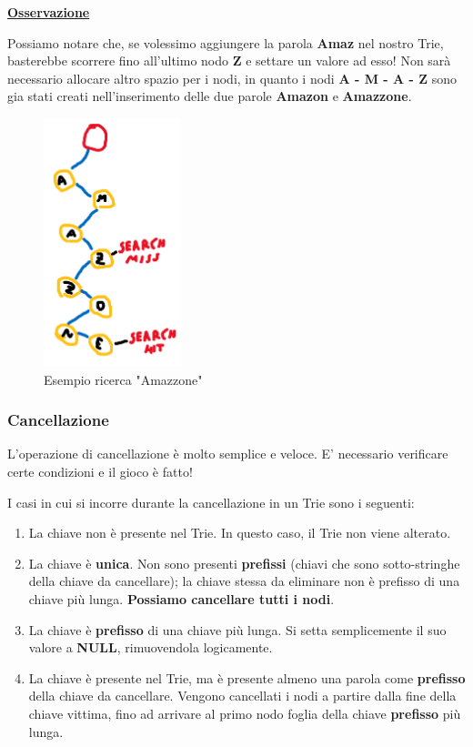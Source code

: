 \documentclass[a4paper, 12pt]{article}
\begin{document}
\textbf{\underline{Osservazione}}

Possiamo notare che, se volessimo aggiungere la parola \textbf{Amaz} nel nostro Trie, basterebbe scorrere fino all'ultimo nodo \textbf{Z} e settare un valore ad esso! Non sarà necessario allocare altro spazio per i nodi, in quanto i nodi \textbf{A - M - A - Z} sono gia stati creati nell'inserimento delle due parole \textbf{Amazon} e \textbf{Amazzone}. 

\begin{figure}[ht!]
    \centering
    \includegraphics[width=4cm]{Images/ricerca.png}
    \caption{Esempio ricerca "Amazzone"}
    \label{fig:my_label}
\end{figure}

\subsubsection{Cancellazione}
L'operazione di cancellazione è molto semplice e veloce. E' necessario verificare certe condizioni e il gioco è fatto!

I casi in cui si incorre durante la cancellazione in un Trie sono i seguenti:

\begin{enumerate}
    \item La chiave non è presente nel Trie. In questo caso, il Trie non viene alterato.
    
    \item La chiave è \textbf{unica}. Non sono presenti \textbf{prefissi} (chiavi che sono sotto-stringhe della chiave da cancellare); la chiave stessa da eliminare non è prefisso di una chiave più lunga. \textbf{Possiamo cancellare tutti i nodi}.
    
    \item La chiave è \textbf{prefisso} di una chiave più lunga. Si setta semplicemente il suo valore a \textbf{NULL}, rimuovendola logicamente.
    
    \item La chiave è presente nel Trie, ma è presente almeno una parola come \textbf{prefisso} della chiave da cancellare. Vengono cancellati i nodi a partire dalla fine della chiave vittima, fino ad arrivare al primo nodo foglia della chiave \textbf{prefisso} più lunga.
\end{enumerate}
\end{document}
